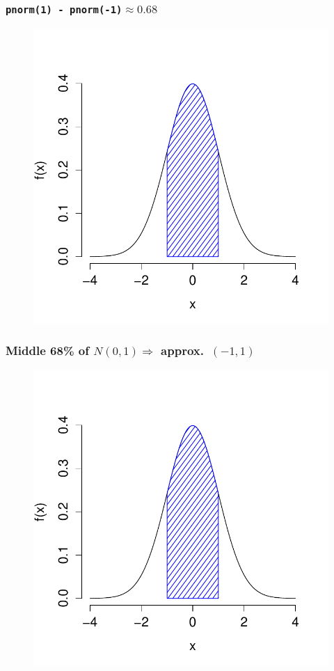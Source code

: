 \documentclass[handout]{beamer}
\begin{document}
\begin{frame}
\frametitle{\texttt{pnorm(1) - pnorm(-1)}$\approx 0.68$}
\begin{figure}
\includegraphics[scale = 0.65]{./images/middle68_3}
\end{figure}
\end{frame}

\begin{frame}
\frametitle{Middle 68\% of $N(0,1) \Rightarrow$ approx.\ $(-1,1)$}
\begin{figure}
\includegraphics[scale = 0.65]{./images/normal_middle68}
\end{figure}
\end{frame}
\end{document}
